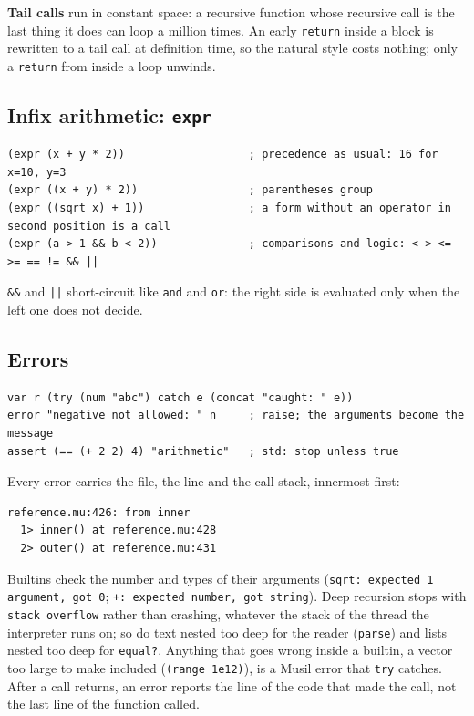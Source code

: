 \documentclass[11pt,a4paper]{article}
\newcommand{\musil}[1]{\lstinline[style=musilinline]{#1}}
\begin{document}
\textbf{Tail calls} run in constant space: a recursive function whose recursive call is
the last thing it does can loop a million times. An early \musil{return} inside a
block is rewritten to a tail call at definition time, so the natural style costs
nothing; only a \musil{return} from inside a loop unwinds.

\subsection{Infix arithmetic: \texttt{expr}}

\begin{lstlisting}
(expr (x + y * 2))                   ; precedence as usual: 16 for x=10, y=3
(expr ((x + y) * 2))                 ; parentheses group
(expr ((sqrt x) + 1))                ; a form without an operator in second position is a call
(expr (a > 1 && b < 2))              ; comparisons and logic: < > <= >= == != && ||
\end{lstlisting}

\texttt{\&\&} and \texttt{||} short-circuit like \musil{and} and \musil{or}: the right side is
evaluated only when the left one does not decide.

\subsection{Errors}

\begin{lstlisting}
var r (try (num "abc") catch e (concat "caught: " e))
error "negative not allowed: " n     ; raise; the arguments become the message
assert (== (+ 2 2) 4) "arithmetic"   ; std: stop unless true
\end{lstlisting}

Every error carries the file, the line and the call stack, innermost first:

\begin{lstlisting}[numbers=none]
reference.mu:426: from inner
  1> inner() at reference.mu:428
  2> outer() at reference.mu:431
\end{lstlisting}

Builtins check the number and types of their arguments
(\texttt{sqrt: expected 1 argument, got 0}; \texttt{+: expected number, got string}).
Deep recursion stops with \texttt{stack overflow} rather than crashing, whatever the stack of
the thread the interpreter runs on; so do text nested too deep for the reader
(\musil{parse}) and lists nested too deep for \musil{equal?}. Anything that goes wrong
inside a builtin, a vector too large to make included (\musil{(range 1e12)}), is a Musil
error that \musil{try} catches. After a call returns, an error reports the line of the
code that made the call, not the last line of the function called.
\end{document}
